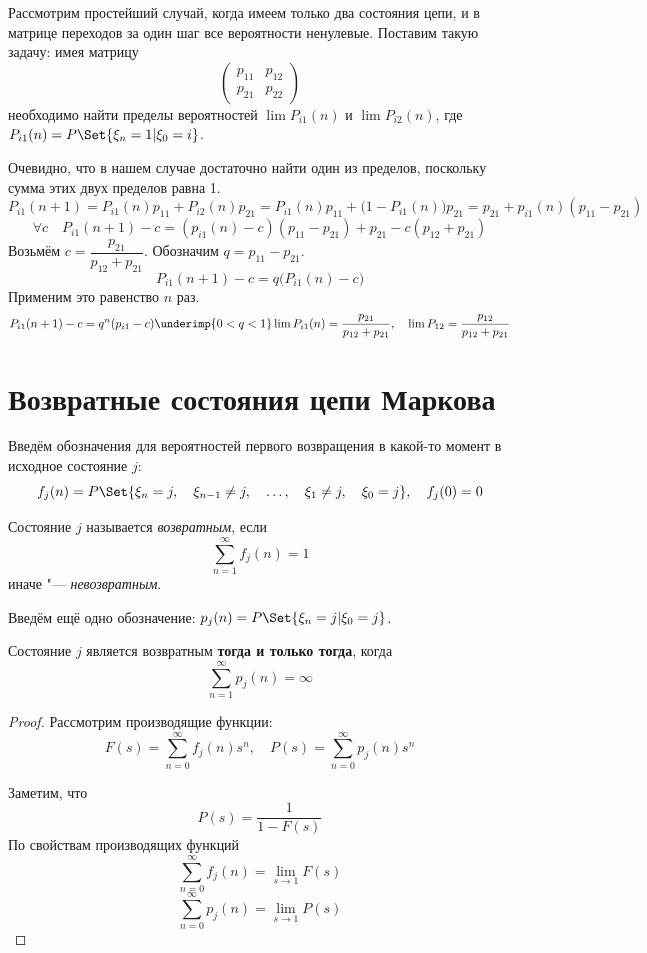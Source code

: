 Рассмотрим простейший случай, когда имеем только два состояния цепи, и в матрице переходов за один
шаг все вероятности ненулевые.
Поставим такую задачу: имея матрицу
$$
\begin{pmatrix}
    p_{11} & p_{12} \\
    p_{21} & p_{22}
\end{pmatrix} $$
необходимо найти пределы вероятностей $ \lim P_{i1}(n) $ и $ \lim P_{i2}(n) $, где $ P_{i1}(n) =
P\Set{\xi_n = 1 | \xi_0 = i} $.

Очевидно, что в нашем случае достаточно найти один из пределов, поскольку сумма этих двух пределов
равна 1.
$$ P_{i1}(n + 1) = P_{i1}(n)p_{11} + P_{i2}(n) p_{21} = P_{i1}(n) p_{11} +
\bigl( 1 - P_{i1}(n) \bigr)p_{21} = p_{21} + p_{i1}(n)(p_{11} - p_{21}) $$
$$ \forall c \quad P_{i1}(n + 1) - c = (p_{i1}(n) - c)(p_{11} - p_{21}) + p_{21} - c(p_{12} + p_{21}) $$
Возьмём $ c = \dfrac{p_{21}}{p_{12} + p_{21}} $.
Обозначим $ q = p_{11} - p_{21} $.
$$ P_{i1}(n + 1) - c = q \bigl( P_{i1}(n) - c \bigr) $$
Применим это равенство $ n $ раз.
$$ P_{i1}(n + 1) - c = q^n(p_{i1} - c) \underimp{0 < q < 1} \lim P_{i1}(n) =
\frac{p_{21}}{p_{12} + p_{21}}, \quad \lim P_{12} = \frac{p_{12}}{p_{12} + p_{21}} $$

\section{Возвратные состояния цепи Маркова}

Введём обозначения для вероятностей первого возвращения в какой-то момент в исходное состояние $ j $:
$$ f_j(n) = P\Set{\xi_n = j, \quad \xi_{n - 1} \ne j, \quad \dots, \quad \xi_1 \ne j, \quad
\xi_0 = j}, \quad f_j(0) = 0 $$

\begin{definition}
    Состояние $ j $ называется \emph{возвратным}, если
    $$ \sum_{n = 1}^\infty f_j(n) = 1 $$
    иначе "--- \emph{невозвратным}.
\end{definition}

Введём ещё одно обозначение: $ p_j(n) = P\Set{\xi_n = j | \xi_0 = j} $.

\begin{theorem}
    Состояние $ j $ является возвратным \textbf{тогда и только тогда}, когда
    $$ \sum_{n = 1}^\infty p_j(n) = \infty $$
\end{theorem}

\begin{proof}
    Рассмотрим производящие функции:
    $$ F(s) = \sum_{n = 0}^\infty f_j(n)s^n, \quad P(s) = \sum_{n = 0}^\infty p_j(n) s^n $$

    Заметим, что
    $$ P(s) = \frac1{1 - F(s)} $$
    По свойствам производящих функций
    $$ \sum_{n = 0}^\infty f_j(n) = \lim\limits_{s \to 1} F(s) $$
    $$ \sum_{n = 0}^\infty p_j(n) = \lim\limits_{s \to 1} P(s) $$
\end{proof}
